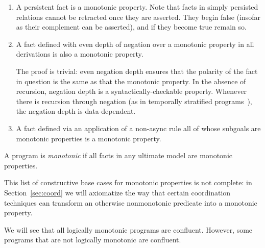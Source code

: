 \begin{enumerate}
\item A persistent fact is a monotonic property.   
Note that facts in simply persisted relations cannot be retracted once they are asserted.  They begin false
(insofar as their complement can be asserted), and if they become true remain so.


\item A fact defined with even depth of negation over a monotonic property in all derivations is also a monotonic property.

The proof is trivial: even negation depth ensures that the polarity of the fact in question is the
same as that the monotonic property.  In the absence of recursion, negation depth is a syntactically-checkable property.  Whenever there is recursion through negation
(as in temporally stratified \lang programs~\cite{dedalus}), the negation depth is data-dependent.


\item A fact defined via an application of a non-async rule all of whose subgoals are monotonic properties is a
monotonic property.


\end{enumerate}

\begin{definition}
A \lang program is {\em monotonic} if all facts in any ultimate model are monotonic properties.  
\end{definition}

This list of constructive base cases for monotonic properties is not complete:  
in Section~\ref{sec:coord} we will
axiomatize the way that certain coordination techniques can transform an otherwise 
nonmonotonic predicate into a monotonic property.


We will see that all logically monotonic programs are confluent.  However, some programs that are not logically monotonic are confluent.

